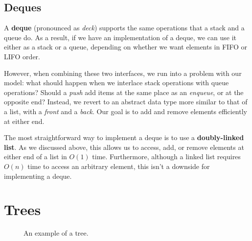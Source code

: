 \subsection{Deques} \label{sec:deque}



A \textbf{deque} (pronounced as \textit{deck}) supports the same operations that a stack and a queue do. As a result, if we have an implementation of a deque, we can use it either as a stack or a queue, depending on whether we want elements in FIFO or LIFO order. 

However, when combining these two interfaces, we run into a problem with our model: what should happen when we interlace stack operations with queue operations? Should a \textit{push} add items at the same place as an \textit{enqueue}, or at the opposite end? Instead, we revert to an abstract data type more similar to that of a list, with a \textit{front} and a \textit{back}. Our goal is to add and remove elements efficiently at either end.

The most straightforward way to implement a deque is to use a \textbf{doubly-linked list}. As we discussed above, this allows us to access, add, or remove elements at either end of a list in $O(1)$ time. Furthermore, although a linked list requires $O(n)$ time to access an arbitrary element, this isn't a downside for implementing a deque.


\section{Trees} \label{sec:trees}

\begin{figure}[h]
\centering
{}
\caption{An example of a tree.}
\label{fig:tree0}
\end{figure}


